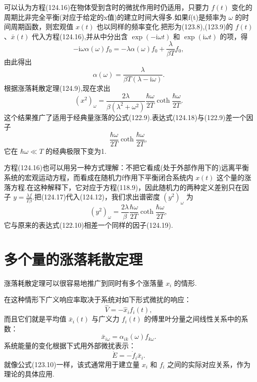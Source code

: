 可以认为方程(124.16)在物体受到含时的微扰作用时仍适用，只要力 $f(t)$ 变化的周期比非完全平衡(对应于给定的x值)的建立时间大得多.如果f(t)是频率为 $\omega$ 的时间周期函数，则宏观值 $x(t)$ 也以同样的频率变化.把形为(123.8),(123.9)的 $f(t)$、$\bar{x}(t)$ 代入方程(124.16),并从中分出含 $\exp(-\mathrm{i}\omega t)$ 和 $\exp(\mathrm{i}\omega t)$ 的项，得
\begin{equation*}
  -\mathrm{i}\omega\alpha(\omega)f_0
  =-\lambda\alpha(\omega)f_0+\frac{\lambda}{\beta T}f_0,
\end{equation*}
由此得出
\begin{equation}
  \alpha(\omega)=\frac{\lambda}{\beta T(\lambda-\mathrm{i}\omega)}.
\end{equation}
根据涨落耗散定理(124.9),现在求出
\begin{equation}
  (x^2)_\omega=\frac{2\lambda}{\beta(\lambda^2+\omega^2)}
  \frac{\hbar\omega}{2T}\coth\frac{\hbar\omega}{2T}.
\end{equation}
这个结果推广了适用于经典量涨落的公式(122.9).表达式(124.18)与(122.9)差一个因子
\begin{equation}
  \frac{\hbar\omega}{2T}\coth\frac{\hbar\omega}{2T},
\end{equation}
它在 $\hbar\omega\ll T$ 的经典极限下变为1.

方程(124.16)也可以用另一种方式理解：不把它看成(处于外部作用下的)远离平衡系统的宏观运动方程，而看成在随机力f作用下平衡闭合系统内 $x(t)$ 这个量的涨落方程.在这种解释下，它对应于方程(118.9)，因此随机力的两种定义差别只在因子 $y=\frac{\lambda f}{T\beta}$.把(124.17)代入(124.12)，我们求出谱密度 $(y^2)_\omega$ 为
\begin{equation}
  (y^2)_\omega=\frac{2\lambda}{\beta}\frac{\hbar\omega}{2T}
  \coth\frac{\hbar\omega}{2T},
\end{equation}
它与原来的表达式(122.10)相差一个同样的因子(124.19).

\section{多个量的涨落耗散定理}

涨落耗散定理可以很容易地推广到同时有多个涨落量 $x_i$ 的情形.

在这种情形下广义响应率取决于系统对如下形式微扰的响应：
\begin{equation}
  \hat{V}=-\hat{x}_if_i(t),
\end{equation}
而且它们就是平均值 $\bar{x}_i(t)$ 与广义力 $f_i(t)$ 的傅里叶分量之间线性关系中的系数：
\begin{equation}
  \bar{x}_{i\omega}=\alpha_{ik}(\omega)f_{k\omega}.
\end{equation}
系统能量的变化根据下式用外部微扰表示：
\begin{equation}
  \dot{E}=-\dot{f}_i\bar{x}_i.
\end{equation}
就像公式(123.10)一样，该式通常用于建立量 $x_i$ 和 $f_i$ 之间的实际对应关系，作为理论的具体应用.

